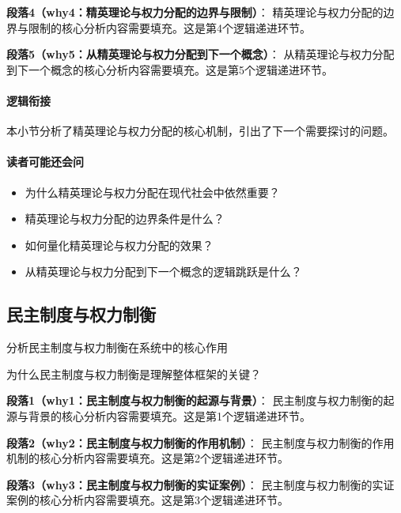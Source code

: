 \documentclass[../main.tex]{subfiles}
\begin{document}
\textbf{段落4（why4：精英理论与权力分配的边界与限制）}：
精英理论与权力分配的边界与限制的核心分析内容需要填充。这是第4个逻辑递进环节。


\textbf{段落5（why5：从精英理论与权力分配到下一个概念）}：
从精英理论与权力分配到下一个概念的核心分析内容需要填充。这是第5个逻辑递进环节。


\paragraph*{逻辑衔接}
本小节分析了精英理论与权力分配的核心机制，引出了下一个需要探讨的问题。

\paragraph*{读者可能还会问}
\begin{itemize}
\item 为什么精英理论与权力分配在现代社会中依然重要？
\item 精英理论与权力分配的边界条件是什么？
\item 如何量化精英理论与权力分配的效果？
\item 从精英理论与权力分配到下一个概念的逻辑跳跃是什么？
\end{itemize}


\subsection{民主制度与权力制衡}

\begin{motivation}
分析民主制度与权力制衡在系统中的核心作用
\end{motivation}

\begin{logicmap}
[逻辑链占位]
\end{logicmap}

\begin{questionbox}
为什么民主制度与权力制衡是理解整体框架的关键？
\end{questionbox}

\textbf{段落1（why1：民主制度与权力制衡的起源与背景）}：
民主制度与权力制衡的起源与背景的核心分析内容需要填充。这是第1个逻辑递进环节。


\textbf{段落2（why2：民主制度与权力制衡的作用机制）}：
民主制度与权力制衡的作用机制的核心分析内容需要填充。这是第2个逻辑递进环节。


\textbf{段落3（why3：民主制度与权力制衡的实证案例）}：
民主制度与权力制衡的实证案例的核心分析内容需要填充。这是第3个逻辑递进环节。
\end{document}
